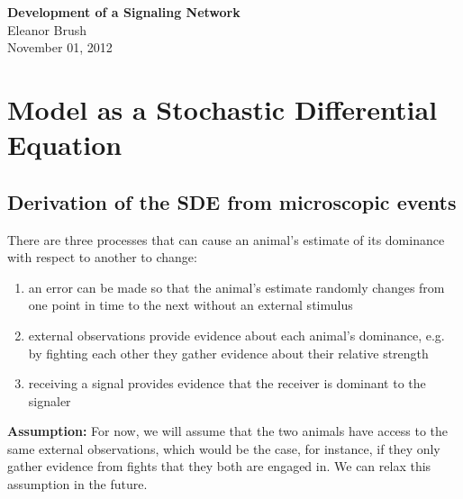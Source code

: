 \documentclass{article}
\begin{document}
\begin{center}
\Large

\end{center}


\vspace{0pt}

\begin{center}
{\bf \LARGE{Development of a Signaling Network}}
\vspace{10pt}
\\ Eleanor Brush
\\ November 01, 2012
\end{center}

\tableofcontents


\vspace{0pt}
\normalsize
\section{Model as a Stochastic Differential Equation}

\subsection{Derivation of the SDE from microscopic events }
There are three processes that can cause an animal's estimate of its dominance with respect to another to change:
\begin{enumerate}
\item an error can be made so that the animal's estimate randomly changes from one point in time to the next without an external stimulus

\item external observations provide evidence about each animal's dominance, e.g. by fighting each other they gather evidence about their relative strength

\item receiving a signal provides evidence that the receiver is dominant to the signaler

\end{enumerate}
{\bf Assumption:} For now, we will assume that the two animals have access to the same external observations, which would be the case, for instance, if they only gather evidence from fights that they both are engaged in.  We can relax this assumption in the future.
\end{document}
